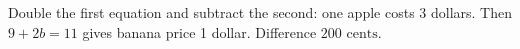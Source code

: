 Double the first equation and subtract the second: one apple costs 3 dollars. Then $9+2b=11$ gives banana price 1 dollar. Difference $\boxed{200\text{ cents}}$.

